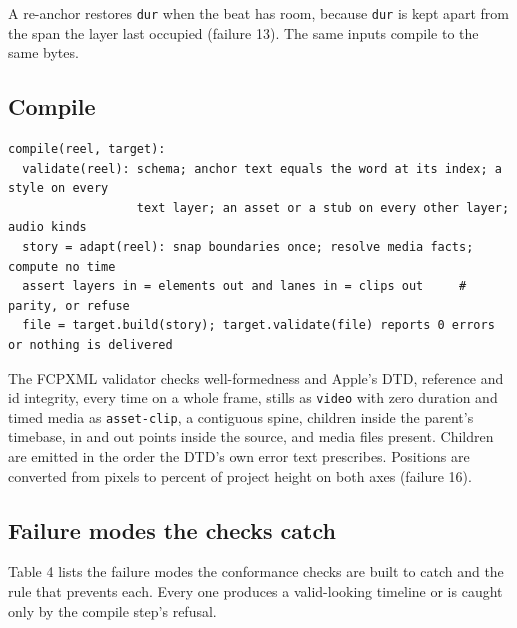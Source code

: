 \documentclass{ceurart}
\begin{document}
A re-anchor restores \texttt{dur} when the beat has room, because
\texttt{dur} is kept apart from the span the layer last occupied
(failure 13). The same inputs compile to the same bytes.

\subsection{Compile}\label{compile}

\begingroup\small\begin{verbatim}
compile(reel, target):
  validate(reel): schema; anchor text equals the word at its index; a style on every
                  text layer; an asset or a stub on every other layer; audio kinds
  story = adapt(reel): snap boundaries once; resolve media facts; compute no time
  assert layers in = elements out and lanes in = clips out     # parity, or refuse
  file = target.build(story); target.validate(file) reports 0 errors or nothing is delivered
\end{verbatim}\endgroup

The FCPXML validator checks well-formedness and Apple's DTD, reference
and id integrity, every time on a whole frame, stills as \texttt{video}
with zero duration and timed media as \texttt{asset-clip}, a contiguous
spine, children inside the parent's timebase, in and out points inside
the source, and media files present. Children are emitted in the order
the DTD's own error text prescribes. Positions are converted from pixels
to percent of project height on both axes (failure 16).

\subsection{Failure modes the checks
catch}\label{failure-modes-the-checks-catch}

Table 4 lists the failure modes the conformance checks are built to
catch and the rule that prevents each. Every one produces a
valid-looking timeline or is caught only by the compile step's refusal.
\end{document}
